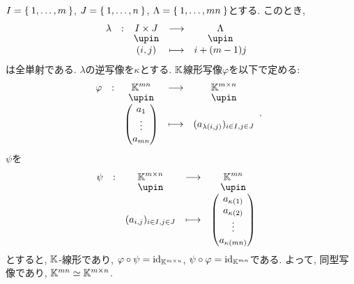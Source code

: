 \begin{example}
  $I=\Set{1,\ldots,m}$, $J=\Set{1,\ldots,n}$,
  $\Lambda=\Set{1,\ldots,mn}$とする.
  このとき,
  \begin{align*}
    &\shazo{\lambda}{I\times J}{\Lambda}{(i,j)}{i+(m-1)j}
  \end{align*}
  は全単射である.  $\lambda$の逆写像を$\kappa$とする.
  $\mathbb{K}$線形写像$\varphi$を以下で定める:
  \begin{align*}
    &\shazo{\varphi}{\KK^{mn}}{\KK^{m\times n}}{\begin{pmatrix}a_1\\\vdots\\a_{mn}\end{pmatrix}}{(a_{\lambda(i,j)})_{i\in I, j\in J}}.
  \end{align*}
  $\psi$を
  \begin{align*}
    &\shazo{\psi}{\KK^{m\times n}}{\KK^{mn}}
    {(a_{i,j})_{i\in I, j\in J}}{\begin{pmatrix}a_{\kappa(1)}\\a_{\kappa(2)}\\\vdots\\a_{\kappa(mn)}\\\end{pmatrix}}
  \end{align*}
  とすると,
  $\mathbb{K}$-線形であり,
  $\varphi\circ \psi=\operatorname{id}_{\mathbb{K}^{m\times n}}$,
  $\psi\circ\varphi=\operatorname{id}_{\mathbb{K}^{mn}}$である.
  よって, 同型写像であり,
  $\mathbb{K}^{mn}\simeq \mathbb{K}^{m\times n}$.
\end{example}





